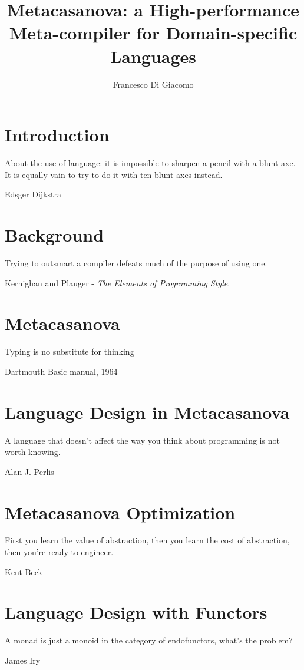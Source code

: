 \documentclass[9pt,a5paper,openright]{extbook}
\author{Francesco Di Giacomo}
\title{Metacasanova: a High-performance Meta-compiler for Domain-specific Languages}
\date { }
\theoremstyle{definition}
\begin{document}
\cleardoublepage
\thispagestyle{empty}
\frontmatter
{} %
\maketitle

\newpage
\tableofcontents

\mainmatter
{}
\chapter{Introduction}
\label{ch:introduction}
\epigraph{About the use of language: it is impossible to sharpen a pencil with a blunt axe. It is equally vain to try to do it with ten blunt axes instead.}{Edsger Dijkstra}

	

\chapter{Background}
\label{ch:background}
\epigraph{Trying to outsmart a compiler defeats much of the purpose of using one.}{Kernighan and Plauger - \textit{The Elements of Programming Style}.}

	
\chapter{Metacasanova}
\label{ch:metacasanova}
\epigraph{Typing is no substitute for thinking}{Dartmouth Basic manual, 1964}
		

\chapter{Language Design in Metacasanova}
\label{ch:languages}
\epigraph{A language that doesn't affect the way you think about programming is not worth knowing.}{Alan J. Perlis}


\chapter{Metacasanova Optimization}
\label{ch:functors}
\epigraph{First you learn the value of abstraction, then you learn the cost of abstraction, then you're ready to engineer.}{Kent Beck}

	
\chapter{Language Design with Functors}
\label{ch:functor_languages}
\epigraph{A monad is just a monoid in the category of endofunctors, what's the problem?}{James Iry}

\end{document}
